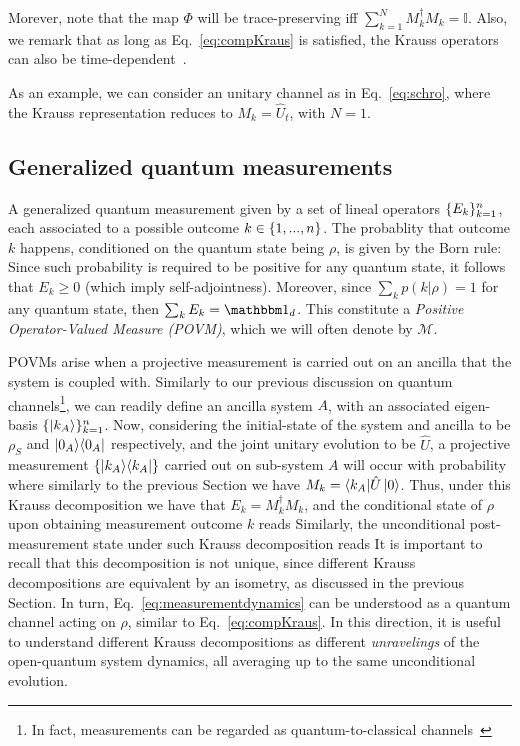 Morever, note that the map $\Phi$ will be trace-preserving iff $\sum_{k=1}^N M^\dagger_k M_k = \mathbb{I}$. Also, we remark that as long as Eq.~\ref{eq:compKraus} is satisfied, the Krauss operators can also be time-dependent~\cite{manzano2019}.

As an example, we can consider an unitary channel as in Eq.~\ref{eq:schro}, where the Krauss representation reduces to $M_k = \hat{U}_t$, with $N=1$.

\subsection{Generalized quantum measurements}\label{ssec:1_intro_qmeas}

A generalized quantum measurement given by a set of lineal operators $\lbrace E_k\rbrace_{k=1}^n$, each associated to a possible outcome $k \in \lbrace 1,...,n\rbrace$. The probablity that outcome $k$ happens, conditioned on the quantum state being $\rho$, is given by the Born rule:  Since such probability is required to be positive for any quantum state, it follows that $E_k\geq0$ (which imply self-adjointness). Moreover, since $\sum_k p(k|\rho) = 1$ for any quantum state, then $\sum_k E_k = \id_d$. This constitute a \textit{Positive Operator-Valued Measure (POVM)}, which we will often denote by $\mathcal{M}$.

POVMs arise when a projective measurement is carried out on an ancilla that the system is coupled with. Similarly to our previous discussion on quantum channels\footnote{In fact, measurements can be regarded as quantum-to-classical channels~\cite{watrous_2018}}, we can readily define an ancilla system $A$, with an associated eigen-basis $\llaves{\ket{k_A}}_{k=1}^n$. Now, considering the initial-state of the system and ancilla to be $\rho_S$ and $\proj{0_A}$ respectively, and the joint unitary evolution to be $\hat{U}$, a projective measurement $\llaves{\proj{k_A}}$ carried out on sub-system $A$ will occur with probability 
where similarly to the previous Section we have $M_k=\langle k_A|\hat{U}\ket{0}$. Thus, under this Krauss decomposition we have that $E_k = M_k^\dagger M_k$, and the conditional state of $\rho$ upon obtaining measurement outcome $k$ reads
Similarly, the unconditional post-measurement state under such Krauss decomposition reads
It is important to recall that this decomposition is not unique, since different Krauss decompositions are equivalent by an isometry, as discussed in the previous Section. In turn, Eq.~\ref{eq:measurementdynamics} can be understood as a quantum channel acting on $\rho$, similar to Eq.~\ref{eq:compKraus}. In this direction, it is useful to understand different Krauss decompositions as different \textit{unravelings} of the open-quantum system dynamics, all averaging up to the same unconditional evolution.

